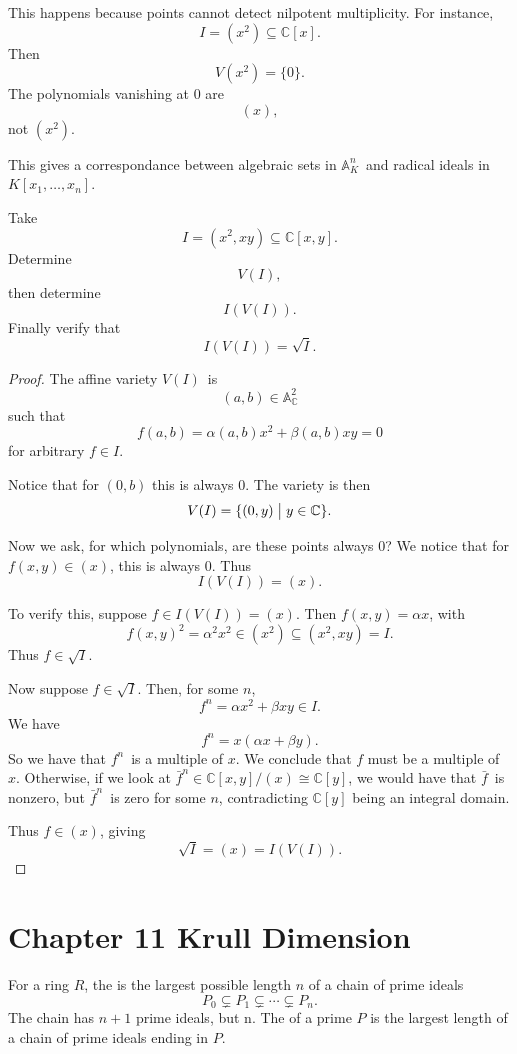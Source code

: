 \documentclass[11pt]{article}
\begin{document}
This happens because points cannot detect nilpotent multiplicity. 
For instance, 
\[
    I = (x^2) \subseteq \mathbb C[x]. 
\]
Then 
\[
    V(x^2) = \{0\}. 
\]
The polynomials vanishing at $0$ are 
\[
    (x), 
\]
not $(x^2)$. 

This gives a correspondance between algebraic sets in 
$\mathbb A_K^n$ and radical ideals in $K[x_1,\ldots,x_n]$. 

\begin{prob}
    Take 
    \[
        I = (x^2,xy) \subseteq \mathbb C[x,y]. 
    \]
    Determine 
    \[
        V(I), 
    \]
    then determine 
    \[
        I(V(I)). 
    \]
    Finally verify that 
    \[
        I(V(I)) = \sqrt I. 
    \]
\end{prob}
\begin{proof}
    The affine variety $V(I)$ is 
    \[
        (a, b) \in \mathbb A_{\mathbb C}^2 
    \]
    such that 
    \[
        f(a,b) = \alpha(a,b) x^2 + \beta(a,b) xy = 0 
    \]
    for arbitrary $f \in I$. 

    Notice that for $(0,b)$ this is always $0$. 
    The variety is then 
    \[
        V(I) = \{(0,y) \bigm| y \in \mathbb C\}. 
    \]

    Now we ask, for which polynomials, are these points always 
    $0$? We notice that for $f(x,y) \in (x)$, this is always $0$.  
    Thus 
    \[
        I(V(I)) = (x). 
    \]

    To verify this, suppose $f \in I(V(I)) = (x)$. 
    Then $f(x,y) = \alpha x$, with 
    \[
        f(x,y)^2 = \alpha^2 x^2 \in (x^2) \subseteq 
        (x^2,xy) = I. 
    \]
    Thus $f \in \sqrt I$. 

    Now suppose $f \in \sqrt I$. Then, for 
    some $n$, 
    \[
        f^n = \alpha x^2 + \beta xy \in I.  
    \]
    We have 
    \[
        f^n = x(\alpha x + \beta y). 
    \]
    So we have that $f^n$ is a multiple of $x$. 
    We conclude that $f$ must be a multiple of $x$. 
    Otherwise, if we look at $\bar{f}^n \in 
    \mathbb C[x,y] / (x) \cong \mathbb C[y]$, we would have that 
    $\bar f$ is nonzero, but $\bar f^n$ is zero for some $n$, 
    contradicting $\mathbb C[y]$ being an integral domain.

    Thus $f \in (x)$, giving 
    \[
        \sqrt I = (x) = I(V(I)).
    \]
    
\end{proof}

\section{Chapter 11 Krull Dimension}
For a ring $R$, the  is the 
largest possible length $n$ of a chain of prime ideals 
\[
    P_0 \subsetneq P_1 \subsetneq \cdots \subsetneq P_n.
\]
The chain has $n+1$ prime ideals, but  n. 
The  of a prime $P$ is the largest length 
of a chain of prime ideals ending in $P$. 
\end{document}
